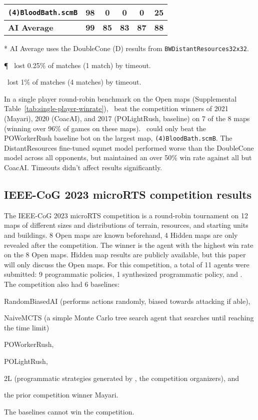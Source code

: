 \documentclass[conference]{IEEEtran}
\begin{document}
\begin{table}[ht]
\begin{threeparttable}
\begin{tabular}{lcccc|c}
    \texttt{(4)BloodBath.scmB} & \textbf{98} & 0 & 0 & 0 & 25\tnote{\dag} \\
    \hline
    \textbf{AI Average}\tnote{*} & \textbf{99} & \textbf{85} & \textbf{83} & \textbf{87} & \textbf{88} \\
    \end{tabular}
    \begin{tablenotes}
    \item[*] AI Average uses the DoubleCone (D) results from \texttt{BWDistantResources32x32}.
    \item[\P] \agentName\ lost 0.25\% of matches (1 match) by timeout.
    \item[\dag] \agentName\ lost  1\% of matches (4 matches) by timeout.
    \end{tablenotes}
    \end{threeparttable}
\end{table}

In a single player round-robin benchmark on the Open maps (Supplemental Table~\ref{tab:single-player-winrate}), \agentName\
beat the competition winners of 2021 (Mayari), 2020 (CoacAI), and 2017 (POLightRush,
baseline) on 7 of the 8 maps (winning over 96\% of games on these maps). \agentName\
could only beat the POWorkerRush baseline bot on the largest map,
\texttt{(4)BloodBath.scmB}. The DistantResources fine-tuned squnet model performed worse than the DoubleCone model
across all opponents, but maintained an over 50\% win rate against all but CoacAI. Timeouts didn't affect results significantly.

\subsection{IEEE-CoG 2023 microRTS competition results}
The IEEE-CoG 2023 microRTS competition is a round-robin tournament on 12 maps of
different sizes and distributions of terrain, resources, and starting units and
buildings. 8 Open maps are known beforehand, 4 Hidden maps are only revealed after the
competition. The winner is the agent with the highest win rate on the 8 Open maps.
Hidden map results are publicly available, but this paper will only discuss
the Open maps. For
this competition, a total of 11 agents were submitted: 9 programmatic policies, 1
synthesized programmatic policy, and \agentName. The competition also had 6
baselines:
\begin{inparaenum}[(1)]
    \item RandomBiasedAI (performs actions randomly, biased towards attacking if able),
    \item NaiveMCTS (a simple Monte Carlo tree search agent that searches until reaching
    the time limit)
    \item POWorkerRush,
    \item POLightRush,
    \item 2L (programmatic strategies generated by \cite{DBLP:conf/ijcai/MoraesAFL23}, the
    competition organizers), and
    \item the prior competition winner Mayari.
\end{inparaenum}
The baselines cannot win the competition.
\end{document}
